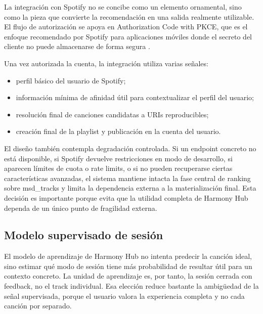 La integración con Spotify no se concibe como un elemento ornamental, sino como
la pieza que convierte la recomendación en una salida realmente utilizable. El
flujo de autorización se apoya en Authorization Code with PKCE, que es
el enfoque recomendado por Spotify para aplicaciones móviles donde el secreto
del cliente no puede almacenarse de forma segura \cite{spotify_pkce}.

Una vez autorizada la cuenta, la integración utiliza varias señales:

\begin{itemize}
    \item perfil básico del usuario de Spotify;
    \item información mínima de afinidad útil para contextualizar el perfil del usuario;
    \item resolución final de canciones candidatas a URIs reproducibles;
    \item creación final de la playlist y publicación en la cuenta del usuario.
\end{itemize}

El diseño también contempla degradación controlada. Si un endpoint concreto no
está disponible, si Spotify devuelve restricciones en modo de desarrollo, si
aparecen límites de cuota o rate limits, o si no pueden recuperarse
ciertas características avanzadas, el sistema mantiene intacta la fase central
de ranking sobre msd\_tracks y limita la dependencia externa a la
materialización final. Esta decisión es importante porque evita que la utilidad
completa de Harmony Hub dependa de un único punto de fragilidad externa.

\subsection{Modelo supervisado de sesión}
\label{subsec:modelo_ml_sesion}

El modelo de aprendizaje de Harmony Hub no intenta predecir la canción ideal,
sino estimar qué modo de sesión tiene más probabilidad de resultar útil para un
contexto concreto. La unidad de aprendizaje es, por tanto, la sesión cerrada
con feedback, no el track individual. Esa elección reduce bastante la
ambigüedad de la señal supervisada, porque el usuario valora la experiencia
completa y no cada canción por separado.

